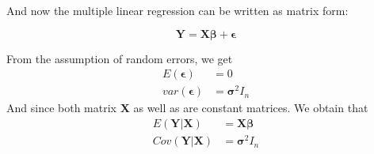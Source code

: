 \documentclass[a4paper]{article}
\begin{document}
\noindent
And now the multiple linear regression can be written as matrix form:
\begin{center}
	\begin{equation*}
	\mathbf{Y}=\mathbf{X}\boldsymbol{\beta}+\boldsymbol{\epsilon}
	\end{equation*}
\end{center}
From the assumption of random errors, we get
\begin{equation*}
	\begin{aligned}
		E(\bm{\epsilon}) & =0 \\
	var(\bm{\epsilon}) & =\bm{\sigma}^2 \textbf{$I_n$}
	\end{aligned}
\end{equation*}
And since both matrix \textbf{X} as well as \bm{$\beta$} are constant matrices. We obtain that 
\begin{equation*}
	\begin{aligned}
		E(\textbf{Y}|\textbf{X}) & = \textbf{X} \bm{\beta} \\
	Cov(\textbf{Y}|\textbf{X}) & =\bm{\sigma}^2 \textbf{$I_n$}
	\end{aligned}
\end{equation*}












%
%
%
%
\end{document}
